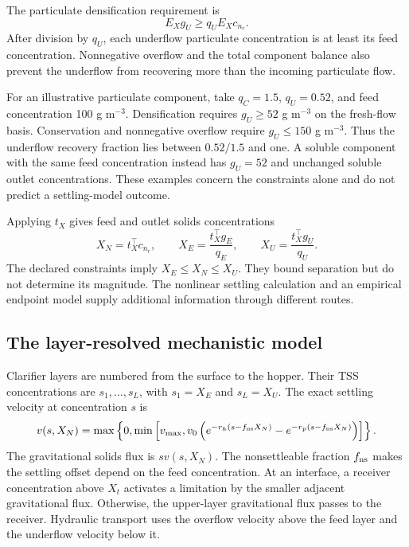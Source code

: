 The particulate densification requirement is
\begin{equation}
E_Xg_U\ge q_UE_Xc_{n_r}.
\label{eq:plant_densification}
\end{equation}
After division by $q_U$, each underflow particulate concentration is at least its feed concentration. Nonnegative overflow and the total component balance also prevent the underflow from recovering more than the incoming particulate flow.

For an illustrative particulate component, take $q_C=1.5$, $q_U=0.52$, and feed concentration 100 g m$^{-3}$. Densification requires $g_U\ge52$ g m$^{-3}$ on the fresh-flow basis. Conservation and nonnegative overflow require $g_U\le150$ g m$^{-3}$. Thus the underflow recovery fraction lies between $0.52/1.5$ and one. A soluble component with the same feed concentration instead has $g_U=52$ and unchanged soluble outlet concentrations. These examples concern the constraints alone and do not predict a settling-model outcome.

Applying $t_X$ gives feed and outlet solids concentrations
\begin{equation}
X_N=t_X^\top c_{n_r},\qquad
X_E=\frac{t_X^\top g_E}{q_E},\qquad
X_U=\frac{t_X^\top g_U}{q_U}.
\label{eq:plant_tss_endpoints}
\end{equation}
The declared constraints imply $X_E\le X_N\le X_U$. They bound separation but do not determine its magnitude. The nonlinear settling calculation and an empirical endpoint model supply additional information through different routes.

\subsection{The layer-resolved mechanistic model}

Clarifier layers are numbered from the surface to the hopper. Their TSS concentrations are $s_1,\ldots,s_L$, with $s_1=X_E$ and $s_L=X_U$. The exact settling velocity at concentration $s$ is
\begin{equation}
v(s,X_N)=\max\left\{0,\min\left[v_{\max},
v_0\left(e^{-r_h(s-f_{\rm ns}X_N)}-e^{-r_p(s-f_{\rm ns}X_N)}\right)\right]\right\}.
\label{eq:plant_settling_velocity}
\end{equation}
The gravitational solids flux is $sv(s,X_N)$. The nonsettleable fraction $f_{\rm ns}$ makes the settling offset depend on the feed concentration. At an interface, a receiver concentration above $X_t$ activates a limitation by the smaller adjacent gravitational flux. Otherwise, the upper-layer gravitational flux passes to the receiver. Hydraulic transport uses the overflow velocity above the feed layer and the underflow velocity below it.


